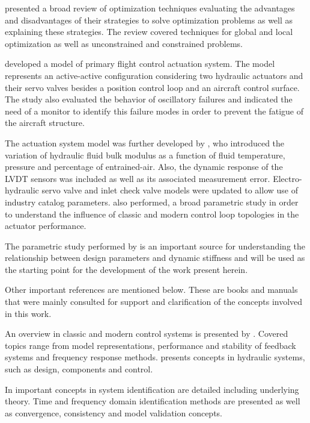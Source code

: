  presented a broad review of optimization techniques evaluating the advantages and disadvantages of their strategies to solve optimization problems as well as explaining these strategies. The review covered techniques for global and local optimization as well as unconstrained and constrained problems.

 developed a model of primary flight control actuation system. The model represents an active-active configuration considering two hydraulic actuators and their servo valves besides a position control loop and an aircraft control surface. The study also evaluated the behavior of oscillatory failures and indicated the need of a monitor to identify this failure modes in order to prevent the fatigue of the aircraft structure.

The actuation system model was further developed by , who introduced the variation of hydraulic fluid bulk modulus as a function of fluid temperature, pressure and percentage of entrained-air. Also, the dynamic response of the LVDT sensors was included as well as its associated measurement error. Electro-hydraulic servo valve and inlet check valve models were updated to allow use of industry catalog parameters.  also performed, a broad parametric study in order to understand the influence of classic and modern control loop topologies in the actuator performance. 

The parametric study performed by  is an important source for understanding the relationship between design parameters and dynamic stiffness and will be used as the starting point for the development of the work present herein.

Other important references  are mentioned below. These are books and manuals that were mainly consulted for support and clarification of the concepts involved in this work.

An overview in classic and modern control systems is presented by . Covered topics range from model representations, performance and stability of feedback systems and frequency response methods.  presents concepts in hydraulic systems, such as design, components and control.

In  important concepts in system identification are detailed including underlying theory. Time and frequency domain identification methods are presented as well as convergence, consistency and model validation concepts. 

